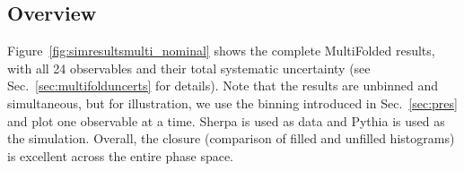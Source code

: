 \label{sec:resultsMulti}

\subsection{Overview}

Figure~\ref{fig:simresultsmulti_nominal} shows the complete MultiFolded results, with all 24 observables and their total systematic uncertainty (see Sec.~\ref{sec:multifolduncerts} for details).  Note that the results are unbinned and simultaneous, but for illustration, we use the binning introduced in Sec.~\ref{sec:pres} and plot one observable at a time.  Sherpa is used as data and Pythia is used as the simulation.  Overall, the closure (comparison of filled and unfilled histograms) is excellent across the entire phase space.  

